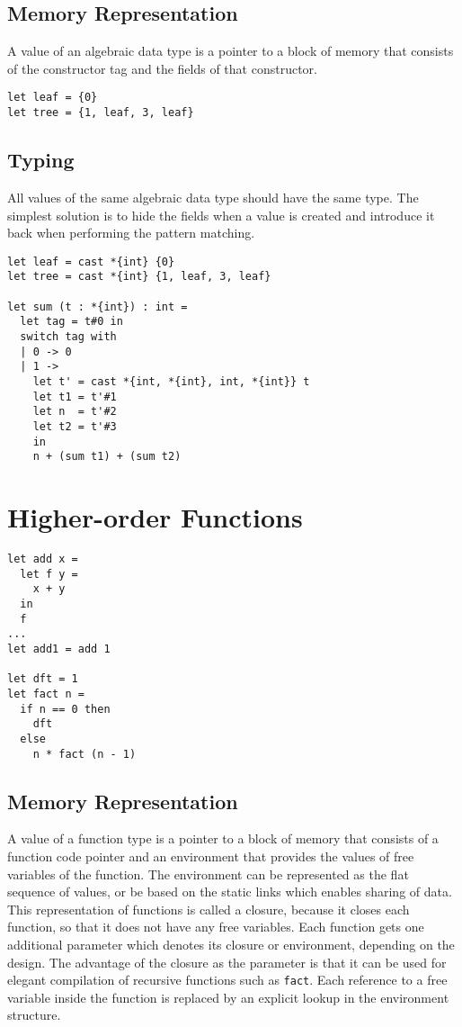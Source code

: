 \documentclass{article}
\begin{document}
\subsection{Memory Representation}
A value of an algebraic data type is a pointer to a block of memory that consists of the constructor tag and the fields of that constructor.

\begin{verbatim}
let leaf = {0}
let tree = {1, leaf, 3, leaf}
\end{verbatim}

\subsection{Typing}
All values of the same algebraic data type should have the same type.
The simplest solution is to hide the fields when a value is created and
introduce it back when performing the pattern matching.

\begin{verbatim}
let leaf = cast *{int} {0}
let tree = cast *{int} {1, leaf, 3, leaf}

let sum (t : *{int}) : int = 
  let tag = t#0 in
  switch tag with
  | 0 -> 0
  | 1 ->
    let t' = cast *{int, *{int}, int, *{int}} t
    let t1 = t'#1
    let n  = t'#2
    let t2 = t'#3
    in
    n + (sum t1) + (sum t2)
\end{verbatim}

\section{Higher-order Functions}
\begin{samepage}
    \begin{verbatim}
let add x =
  let f y = 
    x + y
  in
  f
...
let add1 = add 1

let dft = 1
let fact n =
  if n == 0 then
    dft
  else
    n * fact (n - 1)
\end{verbatim}
\end{samepage}

\subsection{Memory Representation}
A value of a function type is a pointer to a block of memory that consists of a function code pointer
and an environment that provides the values of free variables of the function.
The environment can be represented as the flat sequence of values, or be based on the static links which enables sharing of data.
This representation of functions is called a closure, because it closes each function, so that it does not have any free variables.
Each function gets one additional parameter which denotes its closure or environment, depending on the design.
The advantage of the closure as the parameter is that it can be used for elegant compilation of recursive functions such as \texttt{fact}.
Each reference to a free variable inside the function is replaced by an explicit lookup in the environment structure.
\end{document}
